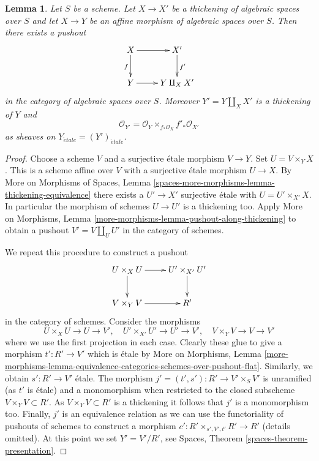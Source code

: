 \documentclass{stacks-project}
\theoremstyle{plain}
\newtheorem{lemma}[subsection]{Lemma}
\theoremstyle{definition}
\theoremstyle{remark}
\numberwithin{equation}{subsection}
\def\etale{{\acute{e}tale}}
\begin{document}
\begin{lemma}
\label{lemma-pushout-along-thickening}
Let $S$ be a scheme. Let $X \to X'$ be a thickening of algebraic spaces
over $S$ and let $X \to Y$ be an affine morphism of algebraic spaces over $S$.
Then there exists a pushout
$$
\xymatrix{
X \ar[r] \ar[d]_f
&
X' \ar[d]^{f'}
\\
Y \ar[r]
&
Y \amalg_X X'
}
$$
in the category of algebraic spaces over $S$. Moreover $Y' = Y \amalg_X X'$
is a thickening of $Y$ and
$$
\mathcal{O}_{Y'} = \mathcal{O}_Y \times_{f_*\mathcal{O}_X} f'_*\mathcal{O}_{X'}
$$
as sheaves on $Y_\etale = (Y')_\etale$.
\end{lemma}

\begin{proof}
Choose a scheme $V$ and a surjective \'etale morphism $V \to Y$.
Set $U = V \times_Y X$. This is a scheme affine over $V$ with a
surjective \'etale morphism $U \to X$. By More on Morphisms of Spaces,
Lemma \ref{spaces-more-morphisms-lemma-thickening-equivalence}
there exists a $U' \to X'$
surjective \'etale with $U = U' \times_{X'} X$. In particular the
morphism of schemes $U \to U'$ is a thickening too. Apply
More on Morphisms, Lemma \ref{more-morphisms-lemma-pushout-along-thickening}
to obtain a pushout $V' = V \amalg_U U'$ in the category of schemes.

\medskip\noindent
We repeat this procedure to construct a pushout
$$
\xymatrix{
U \times_X U \ar[d] \ar[r] & U' \times_{X'} U' \ar[d] \\
V \times_Y V \ar[r] & R'
}
$$
in the category of schemes. Consider the morphisms
$$
U \times_X U \to U \to V',\quad
U' \times_{X'} U' \to U' \to V',\quad
V \times_Y V \to V \to V'
$$
where we use the first projection in each case. Clearly these glue to
give a morphism $t' : R' \to V'$ which is \'etale by
More on Morphisms, Lemma
\ref{more-morphisms-lemma-equivalence-categories-schemes-over-pushout-flat}.
Similarly, we obtain $s' : R' \to V'$ \'etale.
The morphism $j' = (t', s') : R' \to V' \times_S V'$ is unramified
(as $t'$ is \'etale) and a monomorphism when restricted to the closed
subscheme $V \times_Y V \subset R'$. As $V \times_Y V \subset R'$ is
a thickening it follows that $j'$ is a monomorphism too. Finally, $j'$
is an equivalence relation as we can use the functoriality of pushouts
of schemes to construct a morphism $c' : R' \times_{s', V', t'} R' \to R'$
(details omitted). At this point we set $Y' = V'/R'$, see
Spaces, Theorem \ref{spaces-theorem-presentation}.


\end{proof}
\end{document}
